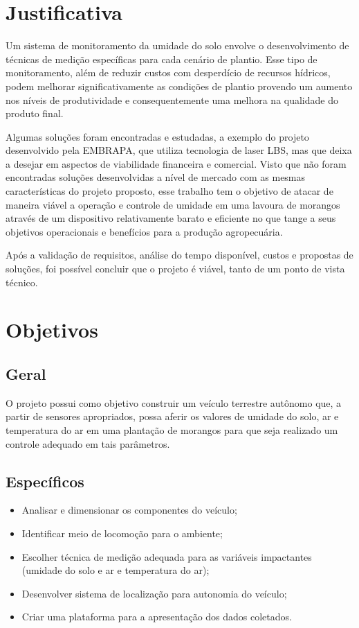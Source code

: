   \section{Justificativa}

  Um sistema de monitoramento da umidade do solo envolve o desenvolvimento de
  técnicas de medição específicas para cada cenário de plantio. Esse tipo de
  monitoramento, além de reduzir custos com desperdício de recursos hídricos,
  podem melhorar significativamente as condições de plantio provendo um aumento
  nos níveis de produtividade e consequentemente uma melhora na qualidade do
  produto final. 

  Algumas soluções foram encontradas e estudadas, a exemplo do projeto
  desenvolvido pela EMBRAPA, que utiliza tecnologia de laser LBS, mas que deixa
  a desejar em aspectos de viabilidade financeira e comercial. Visto que não
  foram encontradas soluções desenvolvidas a nível de mercado com as mesmas
  características do projeto proposto, esse trabalho tem o objetivo de atacar
  de maneira viável a operação e controle de umidade em uma lavoura de morangos
  através de um dispositivo relativamente barato e eficiente no que tange a seus
  objetivos operacionais e benefícios para a produção agropecuária.
   
  Após a validação de requisitos, análise do tempo disponível, custos e propostas
  de soluções, foi possível concluir que o projeto é viável, tanto de um ponto
  de vista técnico.

  \section{Objetivos}

  \subsection{Geral}

  O projeto possui como objetivo construir um veículo terrestre autônomo que,
  a partir de sensores apropriados, possa aferir os valores de umidade do solo,
  ar e temperatura do ar em uma plantação de morangos para que seja realizado
  um controle adequado em tais parâmetros.

  \subsection{Específicos}

  \begin{itemize}
    \item Analisar e dimensionar os componentes do veículo;
    \item Identificar meio de locomoção para o ambiente;
    \item Escolher técnica de medição adequada para as variáveis impactantes (umidade do solo e ar e temperatura do ar);
    \item Desenvolver sistema de localização para autonomia do veículo;
    \item Criar uma plataforma para a apresentação dos dados coletados.
  \end{itemize}

